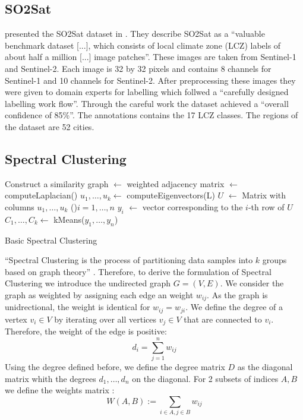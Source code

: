 \subsection{SO2Sat}
\citeauthor{zhu_so2sat_2019} presented the SO2Sat dataset in \cite{zhu_so2sat_2019}. They describe SO2Sat as a \enquote{valuable benchmark dataset [...], which consists of local climate zone (LCZ) labels of about half a million [...] image patches}.
These images are taken from Sentinel-1 and Sentinel-2. Each image is 32 by 32 pixels and contains 8 channels for Sentinel-1 and 10 channels for Sentinel-2.
After preprocessing these images they were given to domain experts for labelling which follwed a \enquote{carefully designed labelling work flow}.
Through the careful work the dataset achieved a \enquote{overall confidence of 85\%}.
The annotations contains the 17 LCZ classes.
The regions of the dataset are 52 cities.

\subsection{Spectral Clustering}
\label{subsec:spectral_clustering}

\begin{algorithm}[b]
  Construct a similarity graph\;
  \Adj \(\leftarrow\) weighted adjacency matrix\;
  \Laplace \(\leftarrow\) computeLaplacian(\Adj)\;
  \(u_1, \ldots, u_k \leftarrow\) computeEigenvectors(L)\;
  \(U\) \(\leftarrow\) Matrix with columns \(u_1, \ldots, u_k\)\;
  \ForEach(){\(i = 1, \ldots, n\)}{
    \(y_i\) \(\leftarrow\) vector corresponding to the \(i\)-th row of \(U\)
  }
\(C_1, \ldots, C_k \leftarrow\) kMeans(\(y_1, \ldots, y_n\))\;

  \caption{Basic Spectral Clustering}\label{alg:basic_spectral}
 \end{algorithm}

\enquote{Spectral Clustering is the process of partitioning data samples into
\(k\) groups based on graph theory} \cite{krajsek_helmholtz_nodate}. Therefore,
to derive the formulation of Spectral Clustering we introduce the undirected graph \(G=(V, E)\).
We consider the graph as weighted by assigning each edge an weight \(w_{ij}\). As the graph
is unidrectional, the weight is identical for \(w_{ij} = w_{ji} \).
We define the degree of a vertex \(v_i \in V\) by iterating over all vertices \(v_j \in V\) that are connected to \(v_i\).
Therefore, the weight of the edge is positive:
\[d_i = \sum_{j=1}^n w_{ij}\]
Using the degree defined before, we define the degree matrix \(D\) as the diagonal matrix whith the degrees \(d_1, \ldots, d_n\) on the diagonal.
\cite{von_luxburg_tutorial_2007}
For 2 subsets of indices \(A, B\) we define the weights matrix \cite{von_luxburg_tutorial_2007}:
\[W(A, B) := \sum_{i \in A, j \in B} w_{ij}\]


